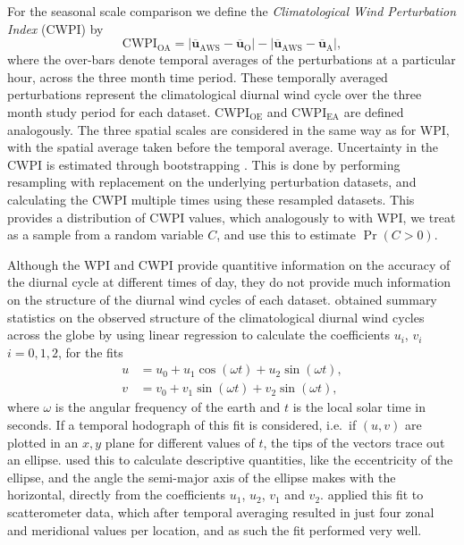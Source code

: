 \documentclass{ametsoc}
\DeclareMathOperator{\pr}{Pr}
\begin{document}
For the seasonal scale comparison we define the \textit{Climatological Wind Perturbation Index} (CWPI) by
\begin{equation}
\text{CWPI}_{\text{OA}} = \left\lvert \overline{\boldsymbol{u}}_{\text{AWS}}-\overline{\boldsymbol{u}}_{\text{O}} \right\rvert - \left\lvert \overline{\boldsymbol{u}}_{\text{AWS}}-\overline{\boldsymbol{u}}_{\text{A}} \right\rvert,
\end{equation}
where the over-bars denote temporal averages of the perturbations at a particular hour, across the three month time period. These temporally averaged perturbations represent the climatological diurnal wind cycle over the three month study period for each dataset. $\text{CWPI}_{\text{OE}}$ and $\text{CWPI}_{\text{EA}}$ are defined analogously. The three spatial scales are considered in the same way as for WPI, with the spatial average taken before the temporal average. Uncertainty in the CWPI is estimated through bootstrapping \citep{efron79}. This is done by performing resampling with replacement on the underlying perturbation datasets, and calculating the CWPI multiple times using these resampled datasets. This provides a distribution of CWPI values, which analogously to with WPI, we treat as a sample from a random variable $C$, and use this to estimate $\pr\left(C > 0\right)$.

Although the WPI and CWPI provide quantitive information on the accuracy of the diurnal cycle at different times of day, they do not provide much information on the structure of the diurnal wind cycles of each dataset. \citet{gille05} obtained summary statistics on the observed structure of the climatological diurnal wind cycles across the globe by using linear regression to calculate the coefficients $u_i$, $v_i$ $i=0,1,2$, for the fits 
\begin{align}
u &= u_0 + u_1 \cos(\omega t) + u_2 \sin(\omega t), \label{Eq:u_h} \\
v &= v_0 + v_1 \sin(\omega t) + v_2 \sin(\omega t), \label{Eq:v_h}
\end{align}
where $\omega$ is the angular frequency of the earth and $t$ is the local solar time in seconds. If a temporal hodograph of this fit is considered, i.e.~if $(u,v)$ are plotted in an $x,y$ plane for different values of $t$, the tips of the vectors trace out an ellipse. \citet{gille05} used this to calculate descriptive quantities, like the eccentricity of the ellipse, and the angle the semi-major axis of the ellipse makes with the horizontal, directly from the coefficients $u_1$, $u_2$, $v_1$ and $v_2$. \citet{gille05} applied this fit to scatterometer data, which after temporal averaging resulted in just four zonal and meridional values per location, and as such the fit performed very well.  
\end{document}
